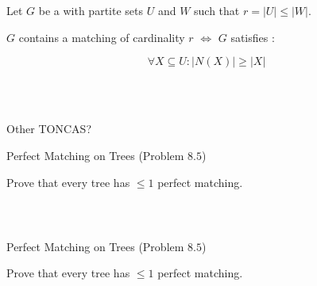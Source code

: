 
\begin{frame}{}
  \begin{theorem}
    Let $G$ be a  with partite sets $U$ and $W$ such that $r = |U| \le |W|$.

    $G$ contains a matching of cardinality $r$ $\iff$ $G$ satisfies :

    \[
      \forall X \subseteq U: \big\lvert N(X) \big\rvert \ge \big\lvert X \big\rvert
    \]
  \end{theorem}

  \pause
  \begin{center}
     \\[5pt]
     \\[8pt]
  \end{center}

  \pause
  \vspace{-0.30cm} 
  \vspace{-0.30cm} 
  \centerline{\footnotesize Other TONCAS?}
\end{frame}

\begin{frame}{}
  \begin{exampleblock}{Perfect Matching on Trees (Problem $8.5$)}
    \begin{center}
      Prove that every tree has $\le 1$ perfect matching.
    \end{center}
  \end{exampleblock}

  \pause
  \begin{center}
     \\[6pt] \pause
  \end{center}

  \pause
  \begin{columns}
      
  \end{columns}
\end{frame}

\begin{frame}{}
  \begin{exampleblock}{Perfect Matching on Trees (Problem $8.5$)}
    \begin{center}
      Prove that every tree has $\le 1$ perfect matching.
    \end{center}
  \end{exampleblock}

  \pause
  \begin{center}
  \end{center}
\end{frame}

